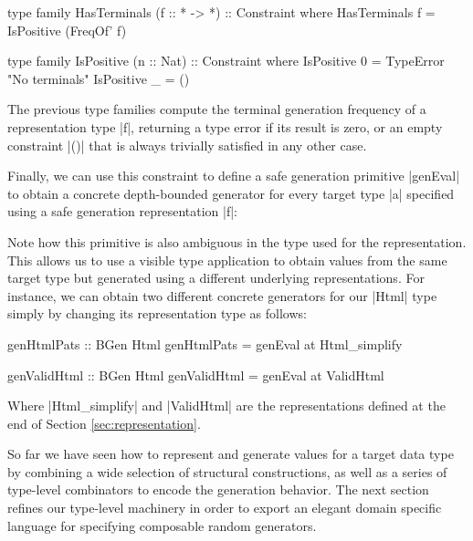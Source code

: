 \begin{code}
type family HasTerminals (f :: * -> *) :: Constraint where
  HasTerminals f = IsPositive (FreqOf' f)

type family IsPositive (n :: Nat) :: Constraint where
  IsPositive 0 = TypeError "No terminals"
  IsPositive _ = ()
\end{code}

The previous type families compute the terminal generation frequency of a
representation type |f|, returning a type error if its result is zero, or an
empty constraint |()| that is always trivially satisfied in any other case.

%
Finally, we can use this constraint to define a safe generation primitive
|genEval| to obtain a concrete depth-bounded generator for every target type |a|
specified using a safe generation representation |f|:


Note how this primitive is also ambiguous in the type used for the
representation.
%
This allows us to use a visible type application to obtain values from the same
target type but generated using a different underlying representations.
%
For instance, we can obtain two different concrete generators for our |Html|
type simply by changing its representation type as follows:

\begin{code}
genHtmlPats :: BGen Html
genHtmlPats = genEval at Html_simplify

genValidHtml :: BGen Html
genValidHtml = genEval  at ValidHtml
\end{code}

Where |Html_simplify| and |ValidHtml| are the representations defined at the end
of Section \ref{sec:representation}.


%
So far we have seen how to represent and generate values for a target data type
by combining a wide selection of structural constructions, as well as a series
of type-level combinators to encode the generation behavior.
%
The next section refines our type-level machinery in order to export an elegant
domain specific language for specifying composable random generators.
